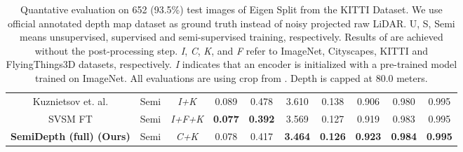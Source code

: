 \documentclass[letterpaper, 10 pt, conference]{ieeeconf}
\begin{document}
\begin{table*}
\begin{tabular}{|c||c||c||c|c|c|c||c|c|c|}
Kuznietsov et. al. \cite{kuznietsov2017semi}   &     Semi    &  \textit{I+K}  &   0.089     &   0.478     &  3.610        &   0.138    &    0.906    &    0.980    &   0.995  \\ 
SVSM FT \cite{luo2018single}           &        Semi         &  \textit{I+F+K}    &   \textbf{0.077}    &   \textbf{0.392}   &  3.569      &     0.127    &    0.919     &      0.983  &    0.995 \\
\textbf{SemiDepth (full) (Ours) }       &        Semi         &  \textit{C+K}    &    0.078  &   0.417  &     \textbf{3.464}    &    \textbf{0.126}       &    \textbf{0.923}   &    \textbf{0.984}        &    \textbf{0.995}      \\  \hline
\end{tabular}
\caption{Quantative evaluation on 652 (93.5\%) test images of Eigen Split from the KITTI Dataset. We use official annotated depth map dataset as ground truth instead of noisy projected raw LiDAR. U, S, Semi means unsupervised, supervised and semi-supervised training, respectively. Results of \cite{godard2017unsupervised, aleotti2018generative} are achieved without the post-processing step. \textit{I}, \textit{C}, \textit{K}, and \textit{F} refer to ImageNet\cite{imagenet_cvpr09}, Cityscapes\cite{Cordts2016Cityscapes}, KITTI\cite{Uhrig2017THREEDV} and FlyingThings3D datasets, respectively. \textit{I} indicates that an encoder is initialized with a pre-trained model trained on ImageNet. All evaluations are using crop from \cite{garg2016unsupervised}. Depth is capped at 80.0 meters.}
\label{tab:result}
\end{table*}
\end{document}

